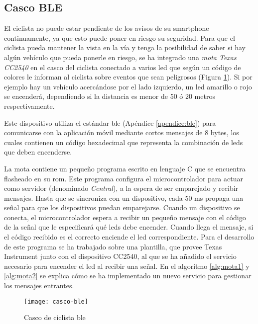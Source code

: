 \FloatBarrier
\subsection{Casco BLE}\label{ssection:cascoBLE}
El ciclista no puede estar pendiente de los avisos de su smartphone
continuamente, ya que esto puede poner en riesgo su seguridad. Para que el
ciclista pueda mantener la vista en la vía y tenga la posibilidad de saber si
hay algún vehículo que pueda ponerle en riesgo, se ha integrado una \emph{mota
Texas CC2540} en el casco del ciclista conectado a varios led que según un
código de colores le informan al ciclista sobre eventos que sean peligrosos
(Figura \ref{fig:casco-ble}). Si por ejemplo hay un vehículo acercándose por el
lado izquierdo, un led amarillo o rojo se encenderá, dependiendo si la
distancia es menor de 50 ó 20 metros respectivamente.

Este dispositivo utiliza el estándar \gls{ble} (Apéndice \ref{apendice:ble})
para comunicarse con la aplicación móvil mediante cortos mensajes de 8 bytes,
los cuales contienen un código hexadecimal que representa la combinación de
leds que deben encenderse.

La mota contiene un pequeño programa escrito en	lenguaje C que se encuentra
flasheado en su \gls{rom}. Este programa configura el microcontrolador para
actuar como servidor (denominado \emph{Central}), a la espera de ser
emparejado y recibir mensajes. Hasta que se sincroniza con un dispositivo,
cada 50 ms propaga una señal para que los dispositivos puedan emparejarse.
Cuando un dispositivo se conecta, el microcontrolador espera a recibir un
pequeño mensaje con el código de la señal que le especificará qué	leds debe
encender. Cuando llega el mensaje, si el código recibido es el correcto
enciende el led correspondiente. Para el desarrollo de este programa se ha
trabajado sobre una plantilla, que provee Texas Instrument junto con el
dispositivo CC2540,	al que se ha añadido el servicio necesario para encender
el led al recibir una señal. En el algoritmo \ref{alg:mota1} y \ref{alg:mota2}
se explica cómo se ha implementado un nuevo servicio para gestionar los
mensajes entrantes.

\begin{figure}[H]
	\begin{center}
		\texttt{[image: casco-ble]}
		\caption{Casco de ciclista \gls{ble}}
		\label{fig:casco-ble}
	\end{center}
\end{figure}

